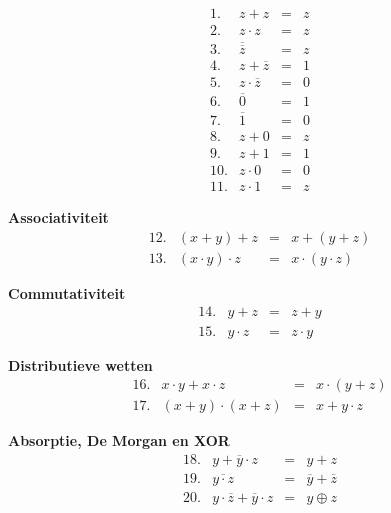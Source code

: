 \documentclass[12pt]{article}
\newcommand\topspace{0.2cm}
\newcommand\bottomspace{0.3cm}
\newcommand\sep{\vspace{\bottomspace}\noindent\hrulefill\vspace{\topspace}}
\begin{document}
\[
\begin{array}{rccc}
1. & z + z &=& z        \\                  
2. & z \cdot z &=& z    \\              
3. & \overline{\overline{z}} &=& z \\
4. & z + \overline{z} &=& 1           \\
5. & z \cdot \overline{z} &=& 0    \\
6. &\overline{0} &=& 1 \\
7. & \overline{1} &=& 0 \\
8. & z + 0 &=& z     \\
9. & z + 1 &=& 1    \\
10. & z \cdot 0 &=& 0 \\
11. & z \cdot 1 &=& z
\end{array}
\]

\sep

\textbf{Associativiteit}\\

\[
\begin{array}{lccc}
12. & (x + y) + z &=& x + (y + z) \\
13. & (x \cdot y) \cdot z &=& x \cdot (y \cdot z)
\end{array}
\]

\sep 

\textbf{Commutativiteit}\\

\[
\begin{array}{lccc}
14. & y + z &=& z + y \\
15. & y \cdot z &=& z \cdot y
\end{array}
\]

\sep

\textbf{Distributieve wetten}\\

\[
\begin{array}{lccc}
16. & x \cdot y + x \cdot z &=& x \cdot (y + z) \\
17. & (x + y) \cdot (x + z) &=& x + y \cdot z 
\end{array}
\]

\sep

\textbf{Absorptie, De Morgan en XOR}\\

\[
\begin{array}{lccc}
18. & y + \overline{y} \cdot z &=& y + z\\
19. & \overline{y \cdot z} &=& \overline{y} + \overline{z} \\
20. & y \cdot \overline{z} + \overline{y} \cdot{z} & = & y \oplus z
\end{array}
\]

\vspace{\bottomspace}\noindent\hrulefill
\end{document}
